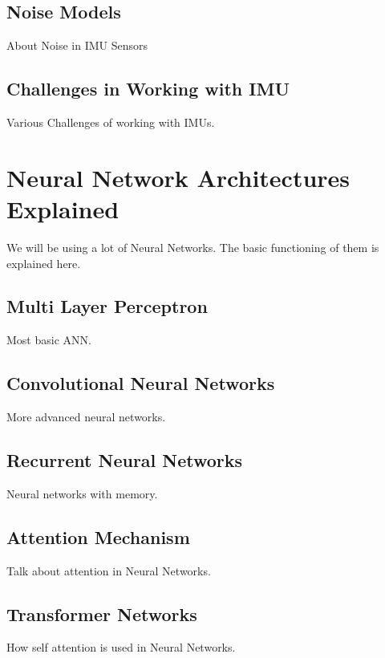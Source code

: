 \subsection{Noise Models}
About Noise in IMU Sensors

\subsection{Challenges in Working with IMU}
Various Challenges of working with IMUs.

\section{Neural Network Architectures Explained}
We will be using a lot of Neural Networks. The basic functioning of them is explained here.

\subsection{Multi Layer Perceptron}
Most basic ANN.

\subsection{Convolutional Neural Networks}
More advanced neural networks.

\subsection{Recurrent Neural Networks}
Neural networks with memory.

\subsection{Attention Mechanism}
Talk about attention in Neural Networks.

\subsection{Transformer Networks}
How self attention is used in Neural Networks.
